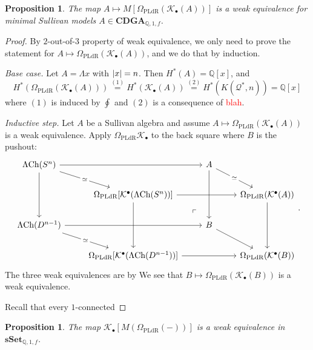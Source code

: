 \documentclass[psamsfonts]{amsart}
\newtheorem{prop}[thm]{Proposition}
\theoremstyle{definition}
\theoremstyle{remark}
\newcommand{\Q}{\mathbb{Q}}
\newcommand{\CDGA}{\mathbf{CDGA}}
\newcommand{\ch}{\textup{Ch}}
\newcommand{\sSet}{\mathbf{sSet}}
\numberwithin{equation}{section}
\begin{document}
\begin{prop}
The map $A\mapsto M[\Omega_\textrm{PLdR}(\mathcal{K}_\bullet(A))]$ is a weak equivalence for minimal Sullivan models $A\in\CDGA_{\Q,1,f}$.  
\end{prop}
\begin{proof}
By $2$-out-of-$3$ property of weak equivalence, we only need to prove the statement for $A\mapsto\Omega_\textrm{PLdR}(\mathcal{K}_\bullet(A))$, and we do that by induction.\medbreak

\textit{Base case.} Let $A=\Lambda x$ with $\abs{x}=n$. Then $H^\ast(A)=\Q[x]$, and
\[H^\ast(\Omega_\textrm{PLdR}(\mathcal{K}_\bullet(A)))\stackrel{(1)}{=}H^\ast(\mathcal{K}_\bullet(A))\stackrel{(2)}{=}H^\ast(K(\mathcal{Q}^\ast,n))=\Q[x]\]
where $(1)$ is induced by $\oint$ and $(2)$ is a consequence of \textcolor{red}{blah}.\medbreak

\textit{Inductive step.} Let $A$ be a Sullivan algebra and assume $A\mapsto\Omega_\textrm{PLdR}(\mathcal{K}_\bullet(A))$ is a weak equivalence.
Apply $\Omega_\textrm{PLdR}\mathcal{K}_\bullet$ to the back square where $B$ is the pushout:
\[\begin{tikzcd}
	{\Lambda\ch(S^n)} && A\arrow[dd,phantom,"\ulcorner",very near end, shift right=4ex] \\
	& {\Omega_\textrm{PLdR}[\mathcal{K}^\bullet(\Lambda\ch(S^n))]} && {\Omega_\textrm{PLdR}(\mathcal{K}^\bullet(A))} \\
	{\Lambda\ch(D^{n-1})} && B \\
	& {\Omega_\textrm{PLdR}[\mathcal{K}^\bullet(\Lambda\ch(D^{n-1}))]} && {\Omega_\textrm{PLdR}(\mathcal{K}^\bullet(B))}
	\arrow["\simeq"{description}, from=1-1, to=2-2]
	\arrow[from=1-1, to=1-3]
	\arrow[from=2-2,crossing over, to=2-4]
	\arrow["\simeq"{description}, from=1-3, to=2-4]
	\arrow[from=1-1, to=3-1]
	\arrow[from=2-2,crossing over, to=4-2]
	\arrow["\simeq"{description}, from=3-1, to=4-2]
	\arrow[from=2-4, to=4-4]
	\arrow[from=3-1, to=3-3]
	\arrow[from=1-3, to=3-3]
	\arrow[from=3-3, to=4-4]
	\arrow[from=4-2, to=4-4]
\end{tikzcd}.\]
The three weak equivalences are by 
We see that $B\mapsto\Omega_\textrm{PLdR}(\mathcal{K}_\bullet(B))$ is a weak equivalence.

Recall that every $1$-connected
\end{proof}

\begin{prop}
The map $\mathcal{K}_\bullet[M(\Omega_\textrm{PLdR}(-))]$ is a weak equivalence in ${\sSet_{\Q,1,f}}$.
\end{prop}
\end{document}
